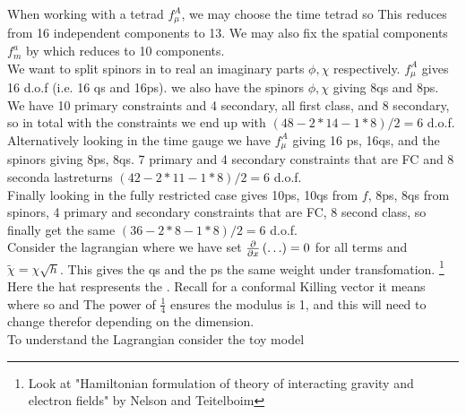 \documentclass{article}
\begin{document}
When working with a tetrad $f_\mu^A$, we may choose the time tetrad so 
This reduces from 16 independent components to 13. We may also fix the spatial components $f_m^a$ by 
which reduces to 10 components.\\
We want to split spinors in to real an imaginary parts $\phi,\chi$ respectively. $f_\mu^A$ gives 16 d.o.f (i.e. 16 qs and 16ps). we also have the spinors $\phi,\chi$ giving 8qs and 8ps. We have 10 primary constraints and 4 secondary, all first class, and 8 secondary, so in total with the constraints we end up with $(48 - 2*14 - 1*8)/2=6$ d.o.f. 
\\
Alternatively looking in the time gauge we have $f_\mu^A$ giving 16 ps, 16qs, and the spinors giving 8ps, 8qs. 7 primary and 4 secondary constraints that are FC and 8 seconda lastreturns $(42-2*11-1*8)/2=6$ d.o.f. 
\\
Finally looking in the fully restricted case gives 10ps, 10qs from $f$, 8ps, 8qs from spinors, 4 primary and secondary constraints that are FC, 8 second class, so finally get the same $(36-2*8-1*8)/2 = 6$ d.o.f. 
\\
Consider the lagrangian 
where we have set $\pd{x}\pround{\dots} = 0$ for all terms and $\tilde{\chi} = \chi\sqrt{h}$. This gives the qs and the ps the same weight under transfomation. \footnote{Look at "Hamiltonian formulation of theory of interacting gravity and electron fields" by Nelson and Teitelboim} Here the hat respresents the . Recall for a conformal Killing vector it means 
where
so 
and
The power of $\frac{1}{4}$ ensures the modulus is 1, and this will need to change therefor depending on the dimension. 
\\
To understand the Lagrangian consider the toy model 
\end{document}
